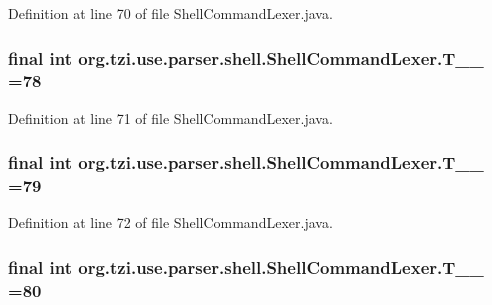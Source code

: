 Definition at line 70 of file Shell\-Command\-Lexer.\-java.

\hypertarget{classorg_1_1tzi_1_1use_1_1parser_1_1shell_1_1_shell_command_lexer_ac598655f4747d5f519da61bdd50d6255}{
\subsubsection[{T\-\_\-\-\_\-78}]{\setlength{\rightskip}{0pt plus 5cm}final int org.\-tzi.\-use.\-parser.\-shell.\-Shell\-Command\-Lexer.\-T\-\_\-\-\_ =78\hspace{0.3cm}{\ttfamily [static]}}}\label{classorg_1_1tzi_1_1use_1_1parser_1_1shell_1_1_shell_command_lexer_ac598655f4747d5f519da61bdd50d6255}


Definition at line 71 of file Shell\-Command\-Lexer.\-java.

\hypertarget{classorg_1_1tzi_1_1use_1_1parser_1_1shell_1_1_shell_command_lexer_acb342c234a2101ed5fd568d5ec0b395b}{
\subsubsection[{T\-\_\-\-\_\-79}]{\setlength{\rightskip}{0pt plus 5cm}final int org.\-tzi.\-use.\-parser.\-shell.\-Shell\-Command\-Lexer.\-T\-\_\-\-\_ =79\hspace{0.3cm}{\ttfamily [static]}}}\label{classorg_1_1tzi_1_1use_1_1parser_1_1shell_1_1_shell_command_lexer_acb342c234a2101ed5fd568d5ec0b395b}


Definition at line 72 of file Shell\-Command\-Lexer.\-java.

\hypertarget{classorg_1_1tzi_1_1use_1_1parser_1_1shell_1_1_shell_command_lexer_a62a163d6b04f2b34a75e3e6dde2ac7ec}{
\subsubsection[{T\-\_\-\-\_\-80}]{\setlength{\rightskip}{0pt plus 5cm}final int org.\-tzi.\-use.\-parser.\-shell.\-Shell\-Command\-Lexer.\-T\-\_\-\-\_ =80\hspace{0.3cm}{\ttfamily [static]}}}\label{classorg_1_1tzi_1_1use_1_1parser_1_1shell_1_1_shell_command_lexer_a62a163d6b04f2b34a75e3e6dde2ac7ec}



